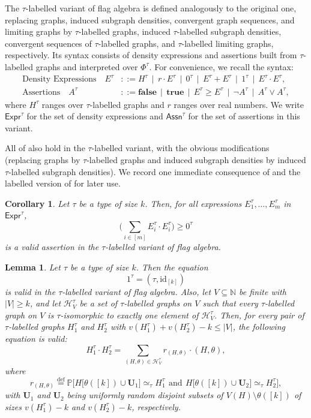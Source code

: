 \documentclass{article}
\newtheorem{cor}[thm]{Corollary}
\newtheorem{lem}[thm]{Lemma}
\newcommand*{\defeq}{\stackrel{\mathrm{def}}{=}}
\newcommand*{\lfalse}{\mathbf{false}}
\newcommand*{\ltrue}{\mathbf{true}}
\newcommand*{\Expr}{\mathsf{Expr}}
\newcommand*{\Assn}{\mathsf{Assn}}
\begin{document}
The $\tau$-labelled variant of flag algebra is defined analogously to the original one, replacing graphs, induced subgraph densities, convergent graph sequences, and limiting graphs by $\tau$-labelled graphs, induced $\tau$-labelled subgraph densities, convergent sequences of $\tau$-labelled graphs, and $\tau$-labelled limiting graphs, respectively.
Its syntax consists of density expressions and assertions built from $\tau$-labelled graphs and interpreted over $\Phi^\tau$.
For convenience, we recall the syntax:
\begin{align*}
\text{Density Expressions}\quad E^\tau & ::= H^\tau \,\mid\, r \cdot E^\tau \,\mid\, 0^\tau \,\mid\, E^\tau + E^\tau \,\mid\, 1^\tau \,\mid\, E^\tau \cdot E^\tau,
\\
\text{Assertions}\quad A^\tau & ::= \lfalse \,\mid\, \ltrue \,\mid\, E^\tau \geq E^\tau \,\mid\, \neg A^\tau \,\mid\, A^\tau \lor A^\tau,
\end{align*}
where $H^\tau$ ranges over $\tau$-labelled graphs and $r$ ranges over real numbers.
We write $\Expr^\tau$ for the set of density expressions and $\Assn^\tau$ for the set of assertions in this variant.

All of  also hold in the $\tau$-labelled variant, with the obvious modifications (replacing graphs by $\tau$-labelled graphs and induced subgraph densities by induced $\tau$-labelled subgraph densities).
We record one immediate consequence of  and the labelled version of  for later use.
\begin{cor}
  \label{cor:basic-algebra-tau:sos}
  Let $\tau$ be a type of size $k$. Then, for all expressions $E_1^\tau,\ldots,E_m^\tau$ in $\Expr^\tau$,
  \[
    \Big(\sum_{i \in [m]} E_i^\tau \cdot E_i^\tau\Big) \geq 0^\tau
  \]
  is a valid assertion in the $\tau$-labelled variant of flag algebra.
\end{cor}
\begin{lem}
  \label{lemma:eliminate-multiplication-tau}
  Let $\tau$ be a type of size $k$. Then the equation
  \[
    1^\tau = (\tau,\mathrm{id}_{[k]})
  \]
  is valid in the $\tau$-labelled variant of flag algebra. Also, let $V \subseteq \mathbb{N}$ be finite with $|V| \geq k$, and let $\mathcal{H}^\tau_V$ be a set of $\tau$-labelled graphs on $V$ such that every $\tau$-labelled graph on $V$ is $\tau$-isomorphic to exactly one element of $\mathcal{H}^\tau_V$. Then, for every pair of $\tau$-labelled graphs $H_1^\tau$ and $H_2^\tau$ with $v(H_1^\tau) + v(H_2^\tau) - k \leq |V|$, the following equation is valid:
  \[
    H_1^\tau \cdot H_2^\tau = \sum_{(H,\theta) \in \mathcal{H}^\tau_V} r_{(H,\theta)} \cdot (H,\theta),
  \]
  where
  \[
    r_{(H,\theta)} \defeq \mathbb{P}\big[H\big[\theta([k]) \cup \mathbf{U}_1\big] \simeq_\tau H_1^\tau\ \, \mathrm{and}\ \, H\big[\theta([k]) \cup \mathbf{U}_2\big] \simeq_\tau H_2^\tau\big],
  \]
  with $\mathbf{U}_1$ and $\mathbf{U}_2$ being uniformly random disjoint subsets of $V(H) \setminus \theta([k])$ of sizes $v(H_1^\tau) - k$ and $v(H_2^\tau) - k$, respectively.
\end{lem}
\end{document}
